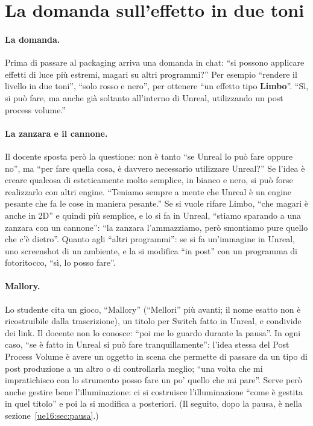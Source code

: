 \section{La domanda sull'effetto in due toni}
\label{ue16:sec:duetoni}

\paragraph{La domanda.} Prima di passare al packaging arriva una domanda in chat: ``si possono
applicare effetti di luce più estremi, magari su altri programmi?'' Per esempio ``rendere il
livello in due toni'', ``solo rosso e nero'', per ottenere ``un effetto tipo
\textbf{Limbo}''. ``Sì, si può fare, ma anche già soltanto all'interno di Unreal, utilizzando
un post process volume.''

\paragraph{La zanzara e il cannone.} Il docente sposta però la questione: non è tanto ``se
Unreal lo può fare oppure no'', ma ``per fare quella cosa, è davvero necessario utilizzare
Unreal?'' Se l'idea è creare qualcosa di esteticamente molto semplice, in bianco e nero, si
può forse realizzarlo con altri engine. ``Teniamo sempre a mente che Unreal è un engine pesante
che fa le cose in maniera pesante.'' Se si vuole rifare Limbo, ``che magari è anche in 2D'' e
quindi più semplice, e lo si fa in Unreal, ``stiamo sparando a una zanzara con un cannone'':
``la zanzara l'ammazziamo, però smontiamo pure quello che c'è dietro''. Quanto agli ``altri
programmi'': se si fa un'immagine in Unreal, uno screenshot di un ambiente, e la si modifica
``in post'' con un programma di fotoritocco, ``sì, lo posso fare''.

\paragraph{Mallory.} Lo studente cita un gioco, ``Mallory'' (``Mellori'' più avanti; il nome
esatto non è ricostruibile dalla trascrizione), un titolo per Switch fatto in Unreal, e
condivide dei link. Il docente non lo conosce: ``poi me lo guardo durante la pausa''. In ogni
caso, ``se è fatto in Unreal si può fare tranquillamente'': l'idea stessa del Post Process
Volume è avere un oggetto in scena che permette di passare da un tipo di post produzione a un
altro o di controllarla meglio; ``una volta che mi impratichisco con lo strumento posso fare
un po' quello che mi pare''. Serve però anche gestire bene l'illuminazione: ci si costruisce
l'illuminazione ``come è gestita in quel titolo'' e poi la si modifica a posteriori. (Il
seguito, dopo la pausa, è nella sezione~\ref{ue16:sec:pausa}.)


